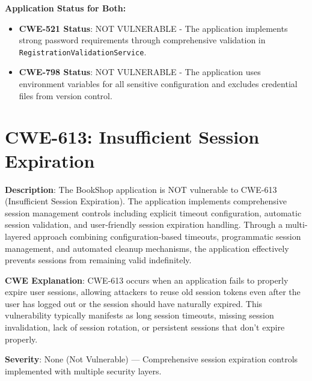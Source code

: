 \documentclass[]{UCD_CS_FYP_Report}
\begin{document}
\textbf{Application Status for Both:}
\begin{itemize}
	\item \textbf{CWE-521 Status}: NOT VULNERABLE - The application implements strong password requirements through comprehensive validation in \texttt{RegistrationValidationService}.
	\item \textbf{CWE-798 Status}: NOT VULNERABLE - The application uses environment variables for all sensitive configuration and excludes credential files from version control.
\end{itemize}

\section{CWE-613: Insufficient Session Expiration}

\textbf{Description}: The BookShop application is NOT vulnerable to CWE-613 (Insufficient Session Expiration). The application implements comprehensive session management controls including explicit timeout configuration, automatic session validation, and user-friendly session expiration handling. Through a multi-layered approach combining configuration-based timeouts, programmatic session management, and automated cleanup mechanisms, the application effectively prevents sessions from remaining valid indefinitely.

\textbf{CWE Explanation}: CWE-613 occurs when an application fails to properly expire user sessions, allowing attackers to reuse old session tokens even after the user has logged out or the session should have naturally expired. This vulnerability typically manifests as long session timeouts, missing session invalidation, lack of session rotation, or persistent sessions that don't expire properly.

\textbf{Severity}: None (Not Vulnerable) — Comprehensive session expiration controls implemented with multiple security layers.
\end{document}

